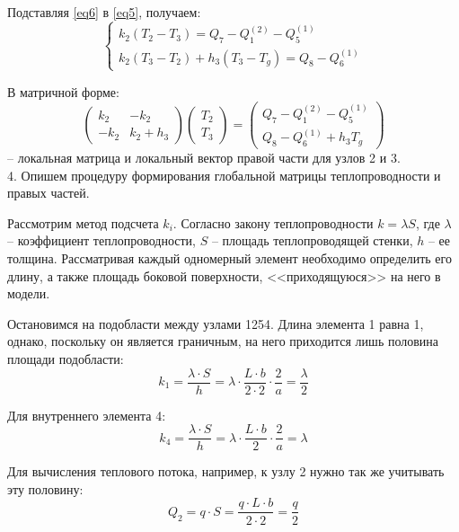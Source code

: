 \documentclass[a4paper, 12pt]{article}
\begin{document}
Подставляя \eqref{eq6} в \eqref{eq5}, получаем:
\begin{equation} \label{eq7}
\begin{cases}
k_2 (T_2 - T_3)  = Q_7 - Q_{1}^{(2)} - Q_{5}^{(1)}\\
k_2 (T_3 - T_2) + h_3 (T_3 - T_g) = Q_8 - Q_{6}^{(1)}
\end{cases}
\end{equation} 

В матричной форме:
\begin{equation} \label{eq8}
\begin{pmatrix}
k_{2} & -k_{2}\\
-k_{2} & k_{2} + h_3
\end{pmatrix}
\begin{pmatrix}
T_2\\
T_3
\end{pmatrix} =
\begin{pmatrix}
Q_7 - Q_{1}^{(2)} - Q_{5}^{(1)}\\
Q_8 - Q_{6}^{(1)} + h_3 T_g
\end{pmatrix}
\end{equation} 
-- локальная матрица и локальный вектор правой части для узлов 2 и 3. \\

4. Опишем процедуру формирования глобальной матрицы теплопроводности и правых частей.

Рассмотрим метод подсчета $k_i$. Согласно закону теплопроводности $k = \lambda S$, где $\lambda$ – коэффициент
теплопроводности, $S$ – площадь теплопроводящей стенки, $h$ – ее толщина. Рассматривая каждый
одномерный элемент необходимо определить его длину, а также площадь боковой поверхности, <<приходящуюся>>
на него в модели.

Остановимся на подобласти между узлами 1254. Длина элемента 1 равна 1, однако, поскольку он является граничным, на него приходится лишь половина площади подобласти:
\[k_1 = \frac{\lambda \cdot S}{h} = \lambda \cdot \frac{L \cdot b}{2\cdot2} \cdot \frac{2}{a} = \frac{\lambda}{2}\]

Для внутреннего элемента 4:
\[k_4 = \frac{\lambda \cdot S}{h} = \lambda \cdot \frac{L \cdot b}{2} \cdot \frac{2}{a} = \lambda\]

Для вычисления теплового потока, например, к узлу 2 нужно так же учитывать эту половину:
\[Q_2 = q \cdot S = \frac{q \cdot L \cdot b}{2 \cdot 2} = \frac{q}{2}\]
\end{document}
